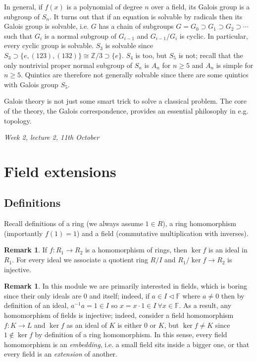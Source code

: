 \documentclass{article}
\newcommand{\F}{\mathbb{F}}
\newcommand{\Z}{\mathbb{Z}}
\theoremstyle{definition}
\newtheorem{remark}[defn]{Remark}
\begin{document}
In general, if $f(x)$ is a polynomial of degree $n$ over a field, its Galois group is a subgroup of $S_n$. It turns out that if an equation is solvable by radicals then its Galois group is solvable, i.e. $G$ has a chain of subgroups $G=G_0\supset G_1\supset G_2\supset\cdots$ such that $G_i$ is a normal subgroup of $G_{i-1}$ and $G_{i-1}/G_i$ is cyclic. In particular, every cyclic group is solvable. $S_3$ is solvable since $S_3\supset\{e,(123),(132)\}\cong\Z/3\supset\{e\}$. $S_4$ is too, but $S_5$ is not; recall that the only nontrivial proper normal subgroup of $S_n$ is $A_n$ for $n\geq 5$ and $A_n$ is simple for $n\geq 5$. Quintics are therefore not generally solvable since there are some quintics with Galois group $S_5$.

Galois theory is not just some smart trick to solve a classical problem. The core of the theory, the Galois correspondence, provides an essential philosophy in e.g. topology.

\begin{flushright}
\textit{Week 2, lecture 2, 11th October}
\end{flushright}

\section{Field extensions}
\subsection{Definitions}
Recall definitions of a ring (we always assume $1\in R$), a ring homomorphism (importantly $f(1)=1$) and a field (commutative multiplication with inverses).
\begin{remark}
If $f:R_1\rightarrow R_2$ is a homomorphism of rings, then $\ker f$ is an ideal in $R_1$. For every ideal we associate a quotient ring $R/I$ and $R_1/\ker f\rightarrow R_2$ is injective.
\end{remark}

\begin{remark}
In this module we are primarily interested in fields, which is boring since their only ideals are $0$ and itself; indeed, if $a\in I\lhd \F$ where $a\neq 0$ then by definition of an ideal, $a^{-1}a=1\in I$ so $x=x\cdot 1\in I \ \forall x\in\F$. As a result, any homomorphism of fields is injective; indeed, consider a field homomorphism $f:K\rightarrow L$ and $\ker f$ as an ideal of $K$ is either 0 or $K$, but $\ker f\neq K$ since $1\notin\ker f$ by definition of a ring homomorphism. In this sense, every field homomorphism is an \textit{embedding}, i.e. a small field sits inside a bigger one, or that every field is an \textit{extension} of another.
\end{remark}
\end{document}
